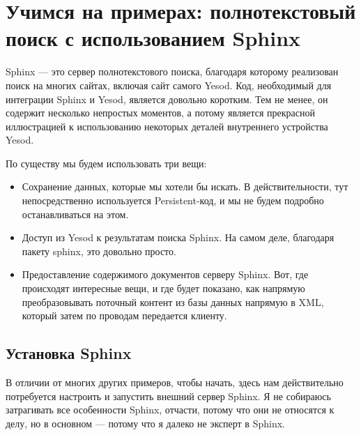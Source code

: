 \chapter{Учимся на примерах: полнотекстовый поиск с использованием Sphinx} %


Sphinx --- это сервер полнотекстового поиска, благодаря которому реализован поиск на многих сайтах, включая сайт самого Yesod. Код, необходимый для интеграции Sphinx и Yesod, является довольно коротким. Тем не менее, он содержит несколько непростых моментов, а потому является прекрасной иллюстрацией к использованию некоторых деталей внутреннего устройства Yesod. %

По существу мы будем использовать три вещи: %

\begin{itemize}
  \item Сохранение данных, которые мы хотели бы искать. В действительности, тут непосредственно используется Persistent-код, и мы не будем подробно останавливаться на этом. %
  \item Доступ из Yesod к результатам поиска Sphinx. На самом деле, благодаря пакету sphinx, это довольно просто.
  \item Предоставление содержимого документов серверу Sphinx. Вот, где происходят интересные вещи, и где будет показано, как напрямую преобразовывать поточный контент из базы данных напрямую в XML, который затем по проводам передается клиенту. %
\end{itemize}

\section{Установка Sphinx} %

В отличии от многих других примеров, чтобы начать, здесь нам действительно потребуется настроить и запустить внешний сервер Sphinx. Я не собираюсь затрагивать все особенности Sphinx, отчасти, потому что они не относятся к делу, но в основном --- потому что я далеко не эксперт в Sphinx.


